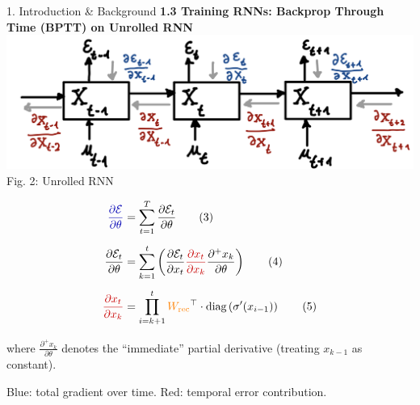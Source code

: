 \documentclass[final]{beamer}
\begin{document}
\begin{frame}[t]
\begin{columns}[t,totalwidth=\textwidth]
\begin{column}{0.33\textwidth}
\begin{block}{1. Introduction \& Background}
        \vspace{1em}
        \textbf{1.3 Training RNNs: Backprop Through Time (BPTT) on Unrolled RNN}\\
        \includegraphics[width=0.95\linewidth]{figures/2_fig.png}\\[0.5em]
        Fig. 2: Unrolled RNN


        \vspace{0.3em}
        \begin{align*}
          \textcolor{myblue}{\frac{\partial \mathcal{E}}{\partial \theta}} &=
          \sum_{t=1}^{T} \frac{\partial \mathcal{E}_t}{\partial \theta} \hspace{2em} \text{(3)} \\[0.5em]
          \frac{\partial \mathcal{E}_t}{\partial \theta} &=
          \sum_{k=1}^{t} 
          \left( {\frac{\partial \mathcal{E}_t}{\partial x_t}} 
          \textcolor{myred}{\frac{\partial x_t}{\partial x_k}}
          \frac{\partial^+ x_k}{\partial \theta} \right) \hspace{2em} \text{(4)} \\[0.5em]
          \textcolor{myred}{\frac{\partial x_t}{\partial x_k}} &=
          \prod_{i=k+1}^{t}
          \textcolor{orange}{W_{\text{rec}}}^\top \cdot \text{diag}\left(\sigma'(x_{i-1})\right) \hspace{2em} \text{(5)}
        \end{align*}
        
        \vspace{0.5em}
        where $\frac{\partial^+ x_k}{\partial \theta}$ denotes the “immediate” partial derivative (treating $x_{k-1}$ as constant).
        
        \vspace{0.5em}
        \textcolor{myblue}{Blue}: total gradient over time.
        \quad
        \textcolor{myred}{Red}: temporal error contribution.

      \end{block}
    \end{column}




\end{columns}
\end{frame}
\end{document}
